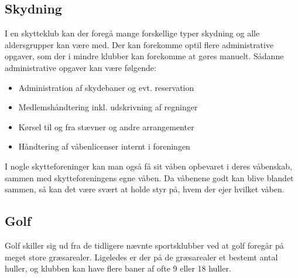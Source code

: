

\subsection{Skydning}

I en skytteklub kan der foregå mange forskellige typer skydning og alle aldersgrupper kan være med. Der kan forekomme optil flere administrative opgaver, som der i mindre klubber kan forekomme at gøres manuelt. Sådanne administrative opgaver kan være følgende:

\begin{itemize}
\item Administration af skydebaner og evt. reservation
\item Medlemshåndtering inkl. udskrivning af regninger
\item Kørsel til og fra stævner og andre arrangementer
\item Håndtering af våbenlicenser internt i foreningen
\end{itemize}

I nogle skytteforeninger kan man også få sit våben opbevaret i deres våbenskab, sammen med skytteforeningens egne våben. Da våbenene godt kan blive blandet sammen, så kan det være svært at holde styr på, hvem der ejer hvilket våben.


\subsection{Golf}

Golf skiller sig ud fra de tidligere nævnte sportsklubber ved at golf foregår på meget store græsarealer. Ligeledes er der på de græsarealer et bestemt antal huller, og klubben kan have flere baner af ofte 9 eller 18 huller. 


